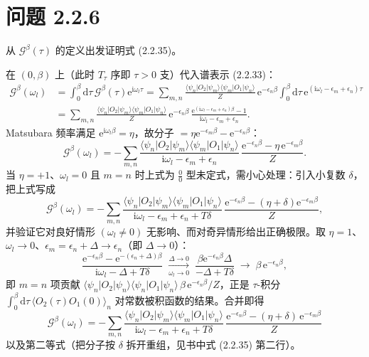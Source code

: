 \section*{问题 2.2.6}
\begin{problem}
从 $\mathcal G^\beta(\tau)$ 的定义出发证明式 (2.2.35)。
\end{problem}
\solution
在 $(0,\beta)$ 上（此时 $T_\tau$ 序即 $\tau>0$ 支）代入谱表示 (2.2.33)：
\begin{align*}
\mathcal G^\beta(\omega_l)&=\int_0^\beta\mathrm{d}\tau\,\mathcal G^\beta(\tau)\mathrm{e}^{\mathrm{i}\omega_l\tau}
=\sum_{m,n}\frac{\langle\psi_n|O_2|\psi_m\rangle\langle\psi_m|O_1|\psi_n\rangle}{Z}\,
\mathrm{e}^{-\epsilon_n\beta}\int_0^\beta\mathrm{d}\tau\,
\mathrm{e}^{(\mathrm{i}\omega_l-\epsilon_m+\epsilon_n)\tau}\\
&=\sum_{m,n}\frac{\langle\psi_n|O_2|\psi_m\rangle\langle\psi_m|O_1|\psi_n\rangle}{Z}\,
\mathrm{e}^{-\epsilon_n\beta}\,
\frac{\mathrm{e}^{(\mathrm{i}\omega_l-\epsilon_m+\epsilon_n)\beta}-1}{\mathrm{i}\omega_l-\epsilon_m+\epsilon_n}.
\end{align*}
 Matsubara 频率满足 $\mathrm{e}^{\mathrm{i}\omega_l\beta}=\eta$，故分子 $=\eta\mathrm{e}^{-\epsilon_m\beta}-\mathrm{e}^{-\epsilon_n\beta}$：
\begin{equation*}
\mathcal G^\beta(\omega_l)=-\sum_{m,n}\frac{\langle\psi_n|O_2|\psi_m\rangle\langle\psi_m|O_1|\psi_n\rangle}
{\mathrm{i}\omega_l-\epsilon_m+\epsilon_n}\,
\frac{\mathrm{e}^{-\epsilon_n\beta}-\eta\,\mathrm{e}^{-\epsilon_m\beta}}{Z}.
\end{equation*}
当 $\eta=+1$、$\omega_l=0$ 且 $m=n$ 时上式为 $\frac00$ 型未定式，需小心处理：引入小复数 $\delta$，把上式写成
\begin{equation*}
\mathcal G^\beta(\omega_l)=-\sum_{m,n}\frac{\langle\psi_n|O_2|\psi_m\rangle\langle\psi_m|O_1|\psi_n\rangle}
{\mathrm{i}\omega_l-\epsilon_m+\epsilon_n+T\delta}\,
\frac{\mathrm{e}^{-\epsilon_n\beta}-(\eta+\delta)\mathrm{e}^{-\epsilon_m\beta}}{Z},
\end{equation*}
并验证它对良好情形 $(\omega_l\neq0)$ 无影响、而对奇异情形给出正确极限。取 $\eta=1$、$\omega_l\to0$、$\epsilon_m=\epsilon_n+\Delta\to\epsilon_n$（即 $\Delta\to0$）：
\begin{equation*}
\frac{\mathrm{e}^{-\epsilon_n\beta}-\mathrm{e}^{-(\epsilon_n+\Delta)\beta}}{\mathrm{i}\omega_l-\Delta+T\delta}
\;\xrightarrow[\omega_l\to0]{\Delta\to0}\;
\frac{\beta\mathrm{e}^{-\epsilon_n\beta}\Delta}{-\Delta+T\delta}\;\to\;\beta\,\mathrm{e}^{-\epsilon_n\beta},
\end{equation*}
即 $m=n$ 项贡献 $\langle\psi_n|O_2|\psi_n\rangle\langle\psi_n|O_1|\psi_n\rangle\,\beta\,\mathrm{e}^{-\epsilon_n\beta}/Z$，正是 $\tau$-积分 $\int_0^\beta\mathrm{d}\tau\,\langle O_2(\tau)O_1(0)\rangle_{n}$ 对常数被积函数的结果。合并即得
\begin{equation*}
\boxed{\;\mathcal G^\beta(\omega_l)=-\sum_{m,n}\frac{\langle\psi_n|O_2|\psi_m\rangle\langle\psi_m|O_1|\psi_n\rangle}
{\mathrm{i}\omega_l-\epsilon_m+\epsilon_n+T\delta}\,
\frac{\mathrm{e}^{-\epsilon_n\beta}-(\eta+\delta)\,\mathrm{e}^{-\epsilon_m\beta}}{Z}\;}
\end{equation*}
以及第二等式（把分子按 $\delta$ 拆开重组，见书中式 (2.2.35) 第二行）。

